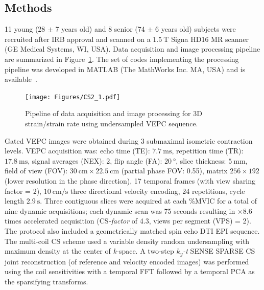 \subsection{Methods}
11 young (28 $\pm$ 7 years old) and 8 senior (74 $\pm$ 6 years old) subjects were recruited after IRB approval and scanned on a $\SI{1.5}{\tesla}$ Signa HD16 MR scanner (GE Medical Systems, WI, USA).
Data acquisition and image processing pipeline are summarized in Figure~\ref{fig: CSYO1}. The set of codes implementing the processing pipeline was developed in MATLAB (The MathWorks Inc. MA, USA) and is available~\cite{3DSR}.
\begin{figure}
\vspace{+0.2cm}
\centering
\texttt{[image: Figures/CS2\_1.pdf]}
\caption[Pipeline of data acquisition and image processing for 3D strain/strain rate using undersampled VEPC sequence]{Pipeline of data acquisition and image processing for 3D strain/strain rate using undersampled VEPC sequence.}
\label{fig: CSYO1}
\end{figure}
Gated VEPC images were obtained during 3 submaximal isometric contraction levels.
VEPC acquisition was: echo time (TE): $\SI{7.7}{\milli\second}$, repetition time (TR): $\SI{17.8}{\milli\second}$, signal averages (NEX): 2, flip angle (FA): $\SI{20}{\degree}$, slice thickness: $\SI{5}{\milli\meter}$, field of view (FOV): $\SI{30}{\centi\meter} \times \SI{22.5}{\centi\meter}$ (partial phase FOV: 0.55), matrix $256 \times 192$ (lower resolution in the phase direction), 17 temporal frames (with view sharing factor = 2), $\SI{10}{\centi\meter/\second}$ three directional velocity encoding, 24 repetitions, cycle length $\SI{2.9}{\second}$.
Three contiguous slices were acquired at each \%MVIC for a total of nine dynamic acquisitions; each dynamic scan was 75 seconds resulting in $\times 8.6$ times accelerated acquisition (\mbox{CS\textit{-factor}} of 4.3, views per segment (VPS) = 2). 
The protocol also included a geometrically matched spin echo DTI EPI sequence.
The multi-coil CS scheme used a variable density random undersampling with maximum density at the center of \mbox{\textit{k-}space}. 
A two-step $k_y$\textit{-t} SENSE SPARSE CS joint reconstruction (of reference and velocity encoded images) was performed~\cite{RNCS10} using the coil sensitivities with a temporal FFT followed by a temporal PCA as the sparsifying transforms. 
